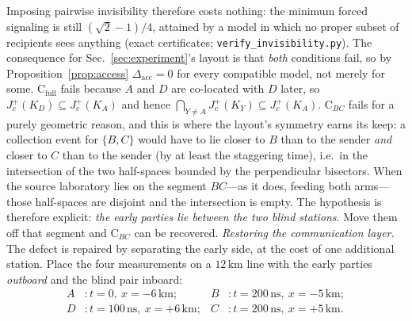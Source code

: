 \documentclass[10pt,twocolumn]{article}
\newcommand{\Dacc}{\Delta_{\mathrm{acc}}}
\newcommand{\CBC}{\mathrm{C}_{BC}}
\newcommand{\CFull}{\mathrm{C}_{\mathrm{full}}}
\begin{document}
Imposing pairwise invisibility therefore costs nothing: the minimum forced signaling is still $(\sqrt2-1)/4$, attained by a model in which no proper subset of recipients sees anything (exact certificates; \texttt{verify\_invisibility.py}). The consequence for Sec.~\ref{sec:experiment}'s layout is that \emph{both} conditions fail, so by Proposition~\ref{prop:access} $\Dacc=0$ for every compatible model, not merely for some. $\CFull$ fails because $A$ and $D$ are co-located with $D$ later, so $J_c^+(K_D)\subseteq J_c^+(K_A)$ and hence $\bigcap_{Y\neq A}J_c^+(K_Y)\subseteq J_c^+(K_A)$. $\CBC$ fails for a purely geometric reason, and this is where the layout's symmetry earns its keep: a collection event for $\{B,C\}$ would have to lie closer to $B$ than to the sender \emph{and} closer to $C$ than to the sender (by at least the staggering time), i.e.\ in the intersection of the two half-spaces bounded by the perpendicular bisectors. When the source laboratory lies on the segment $BC$---as it does, feeding both arms---those half-spaces are disjoint and the intersection is empty. The hypothesis is therefore explicit: \emph{the early parties lie between the two blind stations}. Move them off that segment and $\CBC$ can be recovered. \emph{Restoring the communication layer.} The defect is repaired by separating the early side, at the cost of one additional station. Place the four measurements on a $12$\,km line with the early parties \emph{outboard} and the blind pair inboard:
\begin{align*}
A&: t=0,\ x=-6\,\text{km}; & B&: t=200\,\text{ns},\ x=-5\,\text{km};\\
D&: t=100\,\text{ns},\ x=+6\,\text{km}; & C&: t=200\,\text{ns},\ x=+5\,\text{km}.
\end{align*}
\end{document}
